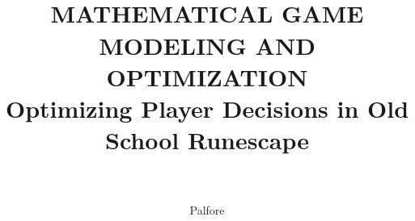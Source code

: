 \documentclass[12pt,a4paper]{article}
\author{Palfore}
\title{
	\HRule{0.5pt}\\
	\LARGE \textbf{\uppercase{Mathematical Game Modeling and Optimization}}\\
	Optimizing Player Decisions in Old School Runescape\\
	\HRule{2pt}\\
}
\begin{document}
\begin{titlepage}
	\maketitle
	\thispagestyle{empty}
\end{titlepage}
\end{document}
